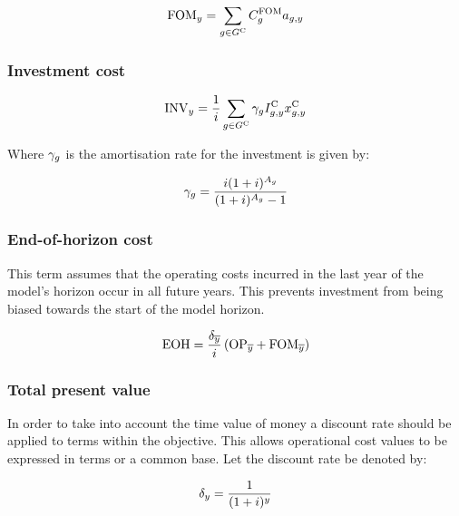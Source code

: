 \documentclass{article}
\begin{document}
\begin{equation}
\cFixedOperationsMaintenanceCost = \sum\limits_{\iGenerator \in \sGeneratorsCandidate} \cFixedOperationsMaintenanceCostGenerator \vInstalledCapacityTotal
\end{equation}

\subsubsection{Investment cost}

\begin{equation}
	\cInvestmentCost = \frac{1}{\cInterestRate}\sum\limits_{g\in \sGeneratorsCandidate} \cAmortisationRate  \cCandidateInvestmentCost \vInstalledCapacity
\end{equation}

Where $\cAmortisationRate$ is the amortisation rate for the investment is given by:

\begin{equation}
	\cAmortisationRate = \frac{\cInterestRate(1+\cInterestRate)^{\cAssetLifetime}}{(1+\cInterestRate)^{\cAssetLifetime} - 1}
\end{equation}

\subsubsection{End-of-horizon cost}
This term assumes that the operating costs incurred in the last year of the model's horizon occur in all future years. This prevents investment from being biased towards the start of the model horizon.

\begin{equation}
	\cEndOfHorizonCost = \frac{\cDiscountRate[\iYearTerminal]}{\cInterestRate} 
	\left(
	\cOperatingCost[\iYearTerminal] 
	+ 
	\cFixedOperationsMaintenanceCost[\iYearTerminal] 
	\right)
\end{equation}

\subsubsection{Total present value}
In order to take into account the time value of money a discount rate should be applied to terms within the objective. This allows operational cost values to be expressed in terms or a common base. Let the discount rate be denoted by:

\begin{equation}
	\cDiscountRate = \frac{1}{(1 + \cInterestRate)^{\iYear}}
\end{equation}
\end{document}
